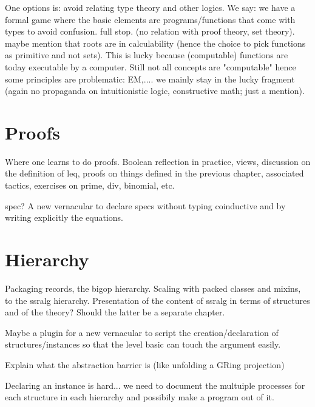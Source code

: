 \documentclass{book}
\begin{document}
One options is: avoid relating type theory and other logics. We say:
we have a formal game where the basic elements are programs/functions
that come with types to avoid confusion. full stop. (no relation with
proof theory, set theory). maybe mention that roots are in calculability (hence
the choice to pick functions as primitive and not sets). This is lucky because
(computable) functions are today executable by a computer.  Still not all
concepts are "computable" hence some principles are problematic: EM,.... we
mainly stay in the lucky fragment (again no propaganda on intuitionistic logic,
constructive math; just a mention).


\chapter{Proofs}

Where one learns to do proofs.
Boolean reflection in practice, views, discussion on the definition of leq,
proofs on things defined in the
previous chapter, associated tactics, exercises on prime, div,
binomial, etc.

spec? A new vernacular to declare specs without typing coinductive and
by writing explicitly the equations.





\chapter{Hierarchy}
Packaging records, the bigop hierarchy.
Scaling with packed classes and mixins, to the ssralg
hierarchy. Presentation of the content of ssralg in terms of structures
and of the theory? Should the latter be a separate chapter.

Maybe a plugin for a new vernacular to script the creation/declaration
of structures/instances so that the level basic can touch the argument
easily.

Explain what the abstraction barrier is (like unfolding a GRing projection)



Declaring an instance is hard... we need to document the multuiple processes
for each structure in each hierarchy and possibily make a program out of it.
\end{document}
